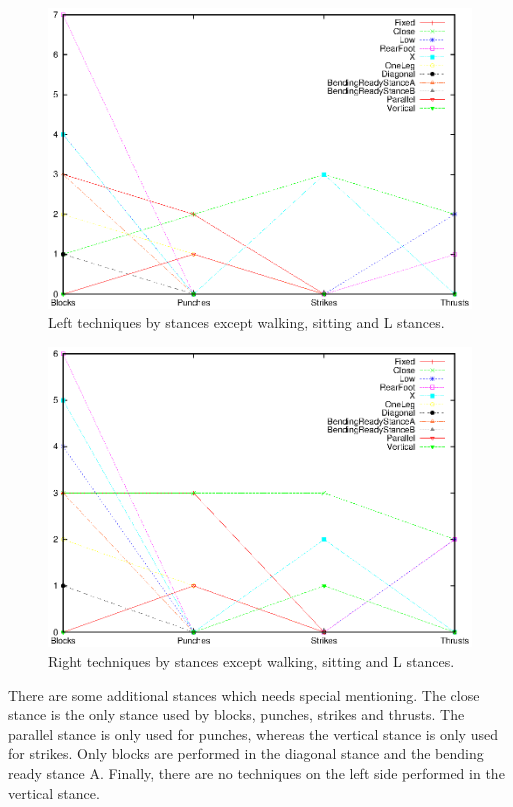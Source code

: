 \documentclass[10pt,twocolumn,a4paper]{article}
\begin{document}
  \begin{figure}
    \includegraphics[scale=0.72]{data/gnuplot/eps/stances_left_not_wsl}
    \caption{Left techniques by stances except walking, sitting and L stances.}
    \label{fig:stances_left_not_wsl}
  \end{figure}

  \begin{figure}
    \includegraphics[scale=0.72]{data/gnuplot/eps/stances_right_not_wsl}
    \caption{Right techniques by stances except walking, sitting and L
    stances.}
    \label{fig:stances_right_not_wsl}
  \end{figure}

  There are some additional stances which needs special mentioning. The close
  stance is the only stance used by blocks, punches, strikes and thrusts. The
  parallel stance is only used for punches, whereas the vertical stance is
  only used for strikes. Only blocks are performed in the diagonal stance and
  the bending ready stance A. Finally, there are no techniques on the left
  side performed in the vertical stance.
\end{document}
